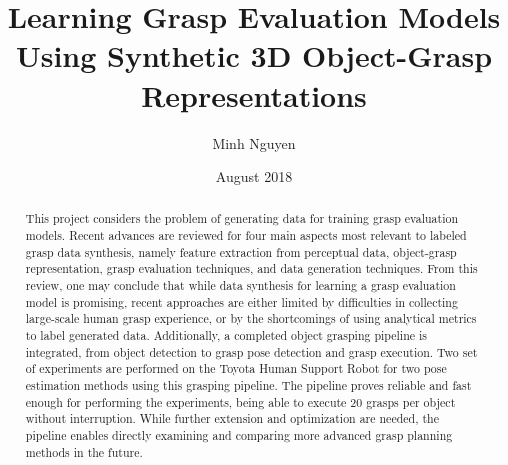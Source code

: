 \documentclass[rnd]{mas_report}
\author{Minh Nguyen}
\title{Learning Grasp Evaluation Models Using Synthetic 3D Object-Grasp Representations}
\date{August 2018}
\begin{document}
\begin{titlepage}
    \maketitle
\end{titlepage}


\pagestyle{plain}


\cleardoublepage
\statementpage

\begin{abstract}
This project considers the problem of generating data for training grasp evaluation models. Recent advances are reviewed
for four main aspects most relevant to labeled grasp data synthesis, namely feature extraction from perceptual data,
object-grasp representation, grasp evaluation techniques, and data generation techniques. From this review, one may
conclude that while data synthesis for learning a grasp evaluation model is promising, recent approaches are either
limited by difficulties in collecting large-scale human grasp experience, or by the shortcomings of using analytical
metrics to label generated data. Additionally, a completed object grasping pipeline is integrated, from object
detection to grasp pose detection and grasp execution. Two set of experiments are performed on the Toyota Human Support
Robot for two pose estimation methods using this grasping pipeline. The pipeline proves reliable and fast enough for
performing the experiments, being able to execute 20 grasps per object without interruption. While further extension and
optimization are needed, the pipeline enables directly examining and comparing more advanced grasp planning methods in
the future.
\end{abstract}

\tableofcontents
\listoffigures
\listoftables


\mainmatter %

\pagestyle{mainmatter}






\end{document}
